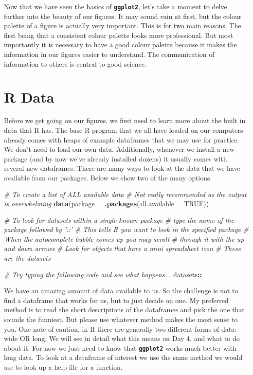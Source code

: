 \documentclass[]{book}
\newenvironment{Shaded}{\begin{snugshade}}{\end{snugshade}}
\newcommand{\KeywordTok}[1]{\textcolor[rgb]{0.13,0.29,0.53}{\textbf{#1}}}
\newcommand{\DataTypeTok}[1]{\textcolor[rgb]{0.13,0.29,0.53}{#1}}
\newcommand{\CommentTok}[1]{\textcolor[rgb]{0.56,0.35,0.01}{\textit{#1}}}
\newcommand{\OtherTok}[1]{\textcolor[rgb]{0.56,0.35,0.01}{#1}}
\newcommand{\OperatorTok}[1]{\textcolor[rgb]{0.81,0.36,0.00}{\textbf{#1}}}
\newcommand{\NormalTok}[1]{#1}
\theoremstyle{definition}
\theoremstyle{definition}
\theoremstyle{definition}
\theoremstyle{remark}
\begin{document}
Now that we have seen the basics of \textbf{\texttt{ggplot2}}, let's
take a moment to delve further into the beauty of our figures. It may
sound vain at first, but the colour palette of a figure is actually very
important. This is for two main reasons. The first being that a
consistent colour palette looks more professional. But most importantly
it is necessary to have a good colour palette because it makes the
information in our figures easier to understand. The communication of
information to others is central to good science.

\section{R Data}\label{r-data}

Before we get going on our figures, we first need to learn more about
the built in data that R has. The base R program that we all have loaded
on our computers already comes with heaps of example dataframes that we
may use for practice. We don't need to load our own data. Additionally,
whenever we install a new package (and by now we've already installed
dozens) it usually comes with several new dataframes. There are many
ways to look at the data that we have available from our packages. Below
we show two of the many options.

\begin{Shaded}
\begin{Highlighting}[]
\CommentTok{# To create a list of ALL available data}
  \CommentTok{# Not really recommended as the output is overwhelming}
\KeywordTok{data}\NormalTok{(}\DataTypeTok{package =} \KeywordTok{.packages}\NormalTok{(}\DataTypeTok{all.available =} \OtherTok{TRUE}\NormalTok{))}

\CommentTok{# To look for datasets within a single known package}
  \CommentTok{# type the name of the package followed by '::'}
  \CommentTok{# This tells R you want to look in the specified package}
  \CommentTok{# When the autocomplete bubble comes up you may scroll}
  \CommentTok{# through it with the up and down arrows}
  \CommentTok{# Look for objects that have a mini spreadsheet icon}
  \CommentTok{# These are the datasets}

\CommentTok{# Try typing the following code and see what happens...}
\NormalTok{datasets}\OperatorTok{::}
\end{Highlighting}
\end{Shaded}

We have an amazing amount of data available to us. So the challenge is
not to find a dataframe that works for us, but to just decide on one. My
preferred method is to read the short descriptions of the dataframes and
pick the one that sounds the funniest. But please use whatever method
makes the most sense to you. One note of caution, in R there are
generally two different forms of data: wide OR long. We will see in
detail what this means on Day 4, and what to do about it. For now we
just need to know that \textbf{\texttt{ggplot2}} works much better with
long data. To look at a dataframe of interest we use the same method we
would use to look up a help file for a function.
\end{document}
